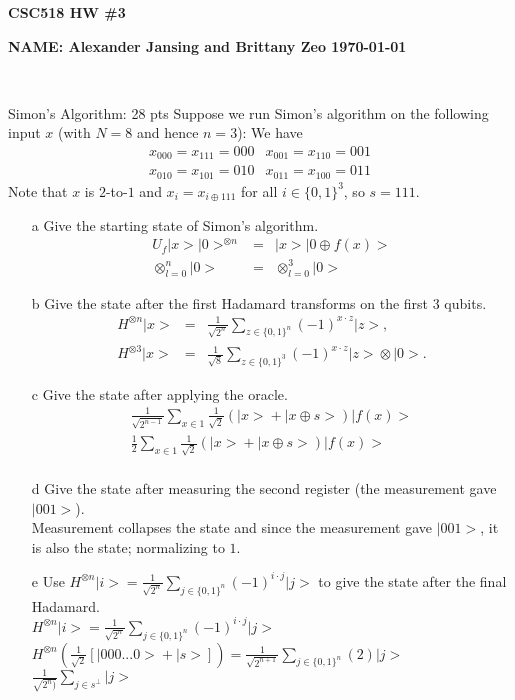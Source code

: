 \documentclass[12pt]{article}
\makeatletter
\newcommand{\<}{\langle}
\renewcommand{\>}{\rangle}
\newenvironment{problem}{\@startsection
       {section}
       {1}
       {-.2em}
       {-3.5ex plus -1ex minus -.2ex}
       {2.3ex plus .2ex}
       {\pagebreak[3]
       \large\bf\noindent{Problem }
       }
       }
       {%
       \begin{center}\large\bf \end{center}}
\def\ket#1{\big|{#1}\big>}
\makeatother
\begin{document}
\centerline{\bf CSC518  \hfill HW \#3}
\centerline{\bf NAME: Alexander Jansing and Brittany Zeo \hfill \today}

\

\noindent

\begin{problem}{Simon's Algorithm: 28 pts}
Suppose we run Simon's algorithm on the following input $x$ (with $N = 8$ and hence $n = 3$):  We have
$$\begin{array}{cc}
x_{000} = x_{111} = 000 & x_{001} = x_{110} = 001\\
x_{010} = x_{101} = 010 & x_{011} = x_{100} = 011
\end{array}
$$
Note that $x$ is $2$-to-$1$ and $x_i = x_{i\oplus 111}$ for all $i \in \{0,1\}^3$, so $s = 111$.
\begin{enumerate}
\item[a] Give the starting state of Simon's algorithm.\\
$$\begin{array}{ccc}
U_f\ket{x}\ket{0}^{\otimes n} &=& \ket{x}\ket{0\oplus f(x)}\\
\otimes_{l = 0}^n\ket{0} &=& \otimes_{l = 0}^3\ket{0}
\end{array} $$
\item[b] Give the state after the first Hadamard transforms on the first 3 qubits.\\
$$\begin{array}{ccc}
H^{\otimes n}\ket{x} &=& \frac{1}{\sqrt{2^n}}\sum\limits_{z\in\{0,1\}^n}(-1)^{x\cdot z}\ket{z},\\
H^{\otimes 3}\ket{x} &=& \frac{1}{\sqrt{8}}\sum\limits_{z\in\{0,1\}^3}(-1)^{x\cdot z}\ket{z} \otimes \ket{0}.
\end{array} $$
\item[c] Give the state after applying the oracle.\\
$$\begin{array}{ccc}
\frac{1}{\sqrt{2^{n-1}}}\sum\limits_{x\in 1}\frac{1}{\sqrt{2}}(\ket{x} + \ket{x\oplus s})\ket{f(x)}\\
\frac{1}{2}\sum\limits_{x\in 1}\frac{1}{\sqrt{2}}(\ket{x} + \ket{x\oplus s})\ket{f(x)}\\
\end{array}$$
\item[d] Give the state after measuring the second register (the measurement gave $\ket{001}$).\\
Measurement collapses the state and since the measurement gave $\ket{001}$, it is also the state; normalizing to $1$. 
\item[e] Use $H^{\otimes n}\ket{i} = \frac{1}{\sqrt{2^n}}\sum\limits_{j\in\{0,1\}^n}(-1)^{i\cdot j}\ket{j}$ to give the state after the final Hadamard.\\
$H^{\otimes n}\ket{i} = \frac{1}{\sqrt{2^n}}\sum\limits_{j\in\{0,1\}^n}(-1)^{i\cdot j}\ket{j}$\\
$H^{\otimes n}(\frac{1}{\sqrt{2}}\left[\ket{000...0}+\ket{s}\right]) = \frac{1}{\sqrt{2^{n+1}}}\sum\limits_{j\in\{0,1\}^n}(2)\ket{j}$\\
$\frac{1}{\sqrt{2^{n})}}\sum\limits_{j\in s^\perp}\ket{j}$\\


\end{enumerate}
\end{problem}
\end{document}

